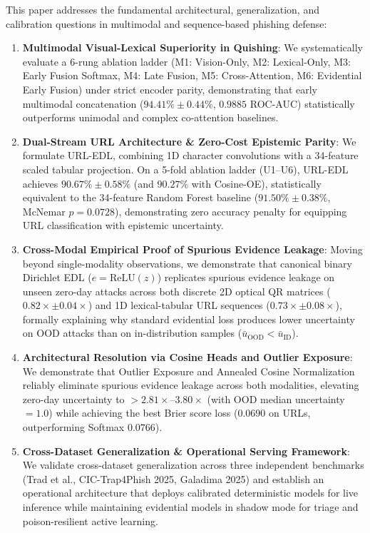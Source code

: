 \documentclass[conference]{IEEEtran}
\begin{document}
This paper addresses the fundamental architectural, generalization, and calibration questions in multimodal and sequence-based phishing defense:
\begin{enumerate}
    \item \textbf{Multimodal Visual-Lexical Superiority in Quishing}: We systematically evaluate a 6-rung ablation ladder (M1: Vision-Only, M2: Lexical-Only, M3: Early Fusion Softmax, M4: Late Fusion, M5: Cross-Attention, M6: Evidential Early Fusion) under strict encoder parity, demonstrating that early multimodal concatenation ($94.41\% \pm 0.44\%$, $0.9885$ ROC-AUC) statistically outperforms unimodal and complex co-attention baselines.
    \item \textbf{Dual-Stream URL Architecture \& Zero-Cost Epistemic Parity}: We formulate URL-EDL, combining 1D character convolutions with a 34-feature scaled tabular projection. On a 5-fold ablation ladder (U1--U6), URL-EDL achieves $90.67\% \pm 0.58\%$ (and $90.27\%$ with Cosine-OE), statistically equivalent to the 34-feature Random Forest baseline ($91.50\% \pm 0.38\%$, McNemar $p = 0.0728$), demonstrating zero accuracy penalty for equipping URL classification with epistemic uncertainty.
    \item \textbf{Cross-Modal Empirical Proof of Spurious Evidence Leakage}: Moving beyond single-modality observations, we demonstrate that canonical binary Dirichlet EDL ($e = \text{ReLU}(z)$) replicates spurious evidence leakage on unseen zero-day attacks across both discrete 2D optical QR matrices ($0.82\times \pm 0.04\times$) and 1D lexical-tabular URL sequences ($0.73\times \pm 0.08\times$), formally explaining why standard evidential loss produces lower uncertainty on OOD attacks than on in-distribution samples ($\bar{u}_{\text{OOD}} < \bar{u}_{\text{ID}}$).
    \item \textbf{Architectural Resolution via Cosine Heads and Outlier Exposure}: We demonstrate that Outlier Exposure and Annealed Cosine Normalization reliably eliminate spurious evidence leakage across both modalities, elevating zero-day uncertainty to $>2.81\times\text{--}3.80\times$ (with OOD median uncertainty $= 1.0$) while achieving the best Brier score loss ($0.0690$ on URLs, outperforming Softmax $0.0766$).
    \item \textbf{Cross-Dataset Generalization \& Operational Serving Framework}: We validate cross-dataset generalization across three independent benchmarks (Trad et al., CIC-Trap4Phish 2025, Galadima 2025) and establish an operational architecture that deploys calibrated deterministic models for live inference while maintaining evidential models in shadow mode for triage and poison-resilient active learning.
\end{enumerate}
\end{document}
